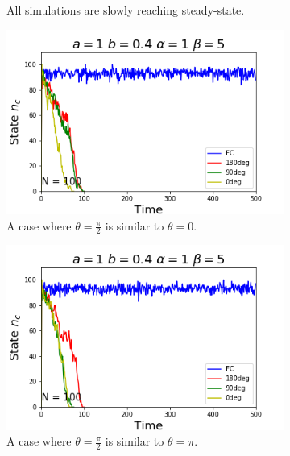 \begin{figure}[h]
\begin{subfigure}[b]{0.4\linewidth}
    \caption{All simulations are slowly reaching steady-state.}
  \end{subfigure}
    \begin{subfigure}[b]{0.4\linewidth}
    \includegraphics[width=\linewidth]{images/chapter4/feedback_sim3.png}
    \caption{A case where $\theta = \frac{\pi}{2}$ is similar to $\theta = 0$.}
  \end{subfigure}
    \begin{subfigure}[b]{0.4\linewidth}
    \includegraphics[width=\linewidth]{images/chapter4/feedback_sim2.png}
    \caption{A case where $\theta = \frac{\pi}{2}$ is similar to $\theta = \pi$.}
  \end{subfigure}
  \begin{subfigure}[b]{0.4\linewidth}

\end{subfigure}
\end{figure}
